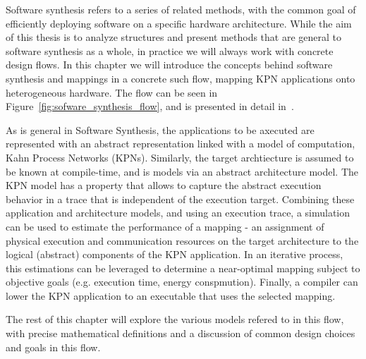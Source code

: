 Software synthesis refers to a series of related methods, with the common goal of efficiently deploying software on a specific hardware architecture. While the aim of this thesis is to analyze structures and present methods that are general to software synthesis as a whole, in practice we will always work with concrete design flows. In this chapter we will introduce the concepts behind software synthesis and mappings in a concrete such flow, mapping KPN applications onto heterogeneous hardware. The flow can be seen in Figure~\ref{fig:sofware_synthesis_flow}, and is presented in detail in~\cite{castrillon_phd}.

As is general in Software Synthesis, the applications to be axecuted are represented with an abstract representation linked with a model of computation, Kahn Process Networks (KPNs). Similarly, the target archtiecture is assumed to be known at compile-time, and is models via an abstract architecture model. The KPN model has a property that allows to capture the abstract execution behavior in a trace that is independent of the execution target. Combining these application and architecture models, and using an execution trace, a simulation can be used to estimate the performance of a mapping - an assignment of physical execution and communication resources on the target architecture to the logical (abstract) components of the KPN application. In an iterative process, this estimations can be leveraged to determine a near-optimal mapping subject to objective goals (e.g. execution time, energy conspmution). Finally, a compiler can lower the KPN application to an executable that uses the selected mapping.

The rest of this chapter will explore the various models refered to in this flow, with precise mathematical definitions and a discussion of common design choices and goals in this flow.